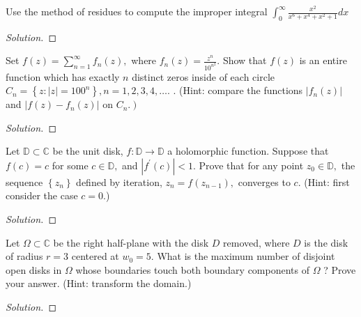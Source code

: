 \documentclass[10pt]{article}
\newenvironment{soln}{\begin{proof}[Solution]}{\end{proof}}
\begin{document}
\begin{problem}
[2014 J-I-4]
Use the method of residues to compute the improper integral $\int_0^{\infty} \frac{x^2}{x^6+x^4+x^2+1} d x$
\end{problem}

\begin{soln}

\end{soln}



\begin{problem}
[2014 J-II-1]
Set $f(z)=\sum_{n=1}^{\infty} f_n(z),$ where $f_n(z)=\frac{z^n}{10^{n^2}}.$ Show that $f(z)$ is an entire function which has exactly ${n}$ distinct zeros inside of each circle $C_n=\left\{z:|z|=100^n\right\}, {n}=1,2,3,4, \ldots.$ . (Hint: compare the functions $\left|f_n(z)\right|$ and $\left|f(z)-f_n(z)\right|$ on $\left.C_n.\right)$
\end{problem}

\begin{soln}

\end{soln}



\begin{problem}
[2014 A-I-5]
Let $\mathbb{D} \subset \mathbb{C}$ be the unit disk, $f: \mathbb{D} \rightarrow \mathbb{D}$ a holomorphic function. Suppose that $f(c)=c$ for some $c \in \mathbb{D},$ and $\left|f^{\prime}(c)\right|<1.$ Prove that for any point $z_0 \in \mathbb{D},$ the sequence $\left\{z_n\right\}$ defined by iteration, $z_n=f\left(z_{n-1}\right),$ converges to $c.$
(Hint: first consider the case $c=0.$)
\end{problem}

\begin{soln}

\end{soln}



\begin{problem}
[2014 A-II-2]
Let $\Omega \subset \mathbb{C}$ be the right half-plane with the disk $D$ removed, where $D$ is the disk of radius $r=3$ centered at $w_0=5.$ What is the maximum number of disjoint open disks in $\Omega$ whose boundaries touch both boundary components of $\Omega$ ? Prove your answer.
(Hint: transform the domain.)
\end{problem}

\begin{soln}

\end{soln}
\end{document}
